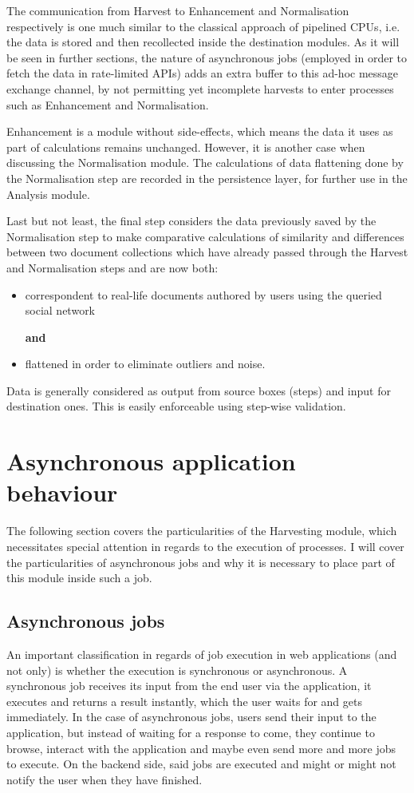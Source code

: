 The communication from Harvest to Enhancement and Normalisation respectively is one much similar to the classical approach of pipelined CPUs, i.e. the data is stored and then recollected inside the destination modules. As it will be seen in further sections, the nature of asynchronous jobs (employed in order to fetch the data in rate-limited APIs) adds an extra buffer to this ad-hoc message exchange channel, by not permitting yet incomplete harvests to enter processes such as Enhancement and Normalisation.

Enhancement is a module without side-effects, which means the data it uses as part of calculations remains unchanged. However, it is another case when discussing the Normalisation module. The calculations of data flattening done by the Normalisation step are recorded in the persistence layer, for further use in the Analysis module.

Last but not least, the final step considers the data previously saved by the Normalisation step to make comparative calculations of similarity and differences between two document collections which have already passed through the Harvest and Normalisation steps and are now both:

\begin{itemize}
\item correspondent to real-life documents authored by users using the queried social network

\textbf{and}
\item flattened in order to eliminate outliers and noise.
\end{itemize}

Data is generally considered as output from source boxes (steps) and input for destination ones. This is easily enforceable using step-wise validation.

\section{Asynchronous application behaviour}
The following section covers the particularities of the Harvesting module, which necessitates special attention in regards to the execution of processes. I will cover the particularities of asynchronous jobs and why it is necessary to place part of this module inside such a job.

\subsection{Asynchronous jobs}
An important classification in regards of job execution in web applications (and not only) is whether the execution is synchronous or asynchronous. A synchronous job receives its input from the end user via the application, it executes and returns a result instantly, which the user waits for and gets immediately. In the case of asynchronous jobs, users send their input to the application, but instead of waiting for a response to come, they continue to browse, interact with the application and maybe even send more and more jobs to execute. On the backend side, said jobs are executed and might or might not notify the user when they have finished.

